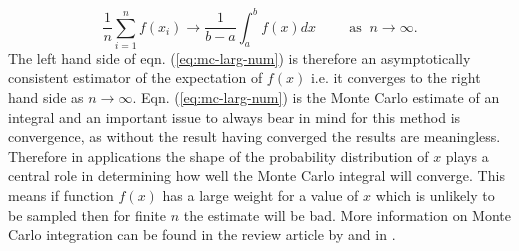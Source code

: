 \begin{equation}
  \label{eq:mc-larg-num}
  \frac{1}{n} \sum_{i=1}^n f(x_i) \rightarrow \frac{1}{b - a}\int_a^b f(x) dx \hspace{1cm}   \text{as } \: n \rightarrow \infty.
\end{equation}
The left hand side of eqn. (\ref{eq:mc-larg-num}) is therefore an asymptotically consistent estimator of the expectation of $f(x)$ i.e. it converges to the right hand side as $n \rightarrow \infty$. Eqn. (\ref{eq:mc-larg-num}) is the Monte Carlo estimate of an integral and an important issue to always bear in mind for this method is convergence, as without the result having converged the results are meaningless. Therefore in applications the shape of the probability distribution of $x$ plays a central role in determining how well the Monte Carlo integral will converge. This means if function $f(x)$ has a large weight for a value of $x$ which is unlikely to be sampled then for finite $n$ the estimate will be bad. More information on Monte Carlo integration can be found in the review article by \cite{James:mc}  and in \citet[Chapter~5]{norris1998markov}.

